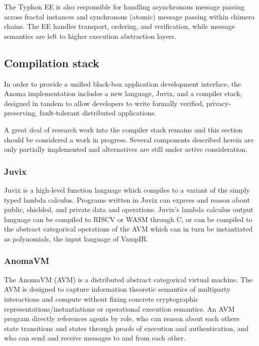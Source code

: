 \documentclass[
    9pt,            %
    commun,        %
    affiltop,       %
]{art}
\begin{document}
The Typhon EE is also responsible for handling asynchronous message
passing across fractal instances and synchronous (atomic) message
passing within chimera chains. The EE handles transport, ordering, and
verification, while message semantics are left to higher execution
abstraction layers.

\subsection{Compilation stack}\label{compilation-stack}

In order to provide a unified black-box application development
interface, the Anoma implementation includes a new language, Juvix, and
a compiler stack, designed in tandem to allow developers to write
formally verified, privacy-preserving, fault-tolerant distributed
applications.

A great deal of research work into the compiler stack remains and this
section should be considered a work in progress. Several components
described herein are only partially implemented and alternatives are
still under active consideration.

\subsubsection{Juvix}\label{juvix}

Juvix is a high-level function language which compiles to a variant of
the simply typed lambda calculus. Programs written in Juvix can express
and reason about public, shielded, and private data and operations.
Juvix's lambda calculus output language can be compiled
to RISCV or WASM through C, or can be compiled to the abstract
categorical operations of the AVM which can in turn be instantiated as
polynomials, the input language of VampIR.

\subsubsection{AnomaVM}\label{anomavm}

The AnomaVM (AVM) is a distributed abstract categorical virtual machine.
The AVM is designed to capture information theoretic semantics of
multiparty interactions and compute without fixing concrete
cryptographic representations/instantiations or operational execution
semantics. An AVM program directly references agents by role, who can
reason about each others state transitions and states through proofs of
execution and authentication, and who can send and receive messages to
and from each other.
\end{document}
